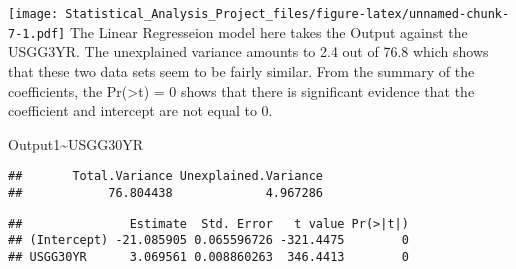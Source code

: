 \documentclass[]{article}
\newenvironment{Shaded}{\begin{snugshade}}{\end{snugshade}}
\newcommand{\KeywordTok}[1]{\textcolor[rgb]{0.13,0.29,0.53}{\textbf{#1}}}
\newcommand{\DataTypeTok}[1]{\textcolor[rgb]{0.13,0.29,0.53}{#1}}
\newcommand{\DecValTok}[1]{\textcolor[rgb]{0.00,0.00,0.81}{#1}}
\newcommand{\OperatorTok}[1]{\textcolor[rgb]{0.81,0.36,0.00}{\textbf{#1}}}
\newcommand{\NormalTok}[1]{#1}
\begin{document}
\texttt{[image: Statistical\_Analysis\_Project\_files/figure-latex/unnamed-chunk-7-1.pdf]}
The Linear Regresseion model here takes the Output against the USGG3YR.
The unexplained variance amounts to 2.4 out of 76.8 which shows that
these two data sets seem to be fairly similar. From the summary of the
coefficients, the Pr(\textgreater{}t) = 0 shows that there is
significant evidence that the coefficient and intercept are not equal to
0.

Output1\textasciitilde{}USGG30YR

\begin{Shaded}
\end{Shaded}

\begin{verbatim}
##       Total.Variance Unexplained.Variance 
##            76.804438             4.967286
\end{verbatim}

\begin{Shaded}
\end{Shaded}

\begin{verbatim}
##               Estimate  Std. Error   t value Pr(>|t|)
## (Intercept) -21.085905 0.065596726 -321.4475        0
## USGG30YR      3.069561 0.008860263  346.4413        0
\end{verbatim}

\begin{Shaded}
\end{Shaded}
\end{document}
